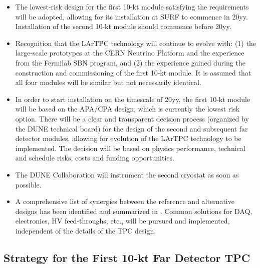 \begin{itemize}
\item The lowest-risk design for the first 10-kt module satisfying the requirements 
will be adopted, allowing for its installation at SURF to commence in 20yy. %
Installation  of the second 10-kt module should commence before 20yy. %

\item  Recognition that the LArTPC technology will continue to evolve with: (1) the 
large-scale prototypes at the CERN Neutrino Platform and the experience from the 
Fermilab SBN program, and (2) the experience gained during the construction and 
commissioning of the first 10-kt module. It is assumed that all four modules 
will be similar but not necessarily identical.

\item  In order to start installation on the timescale of 20yy, %
the first  10-kt module will be based on the APA/CPA design, which is currently the lowest
risk option. There will be a clear and transparent decision process (organized by the DUNE 
technical board) for the design 
of the second and subsequent far detector modules, allowing for evolution of the 
LArTPC technology to be implemented. The decision will be 
based on physics performance, technical and schedule risks, costs and funding 
opportunities.

\item The DUNE Collaboration will instrument the second cryostat as soon as possible.

\item A comprehensive list of synergies between the reference and alternative designs 
has been identified and summarized in \voldune. Common solutions for DAQ, 
electronics, HV feed-throughs, etc., will be pursued and implemented, independent 
of the details of the TPC design.

\end{itemize}

\subsection{Strategy for the First 10-kt Far Detector TPC}



